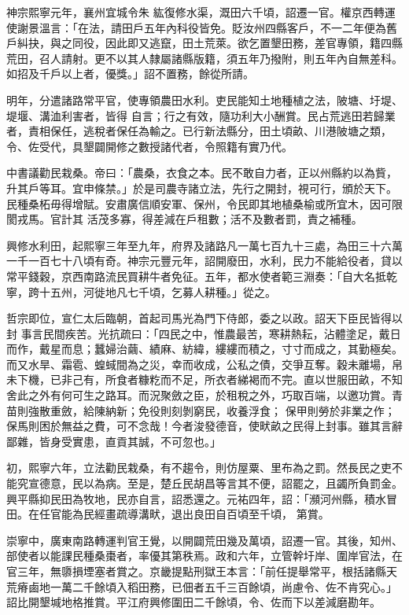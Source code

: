 \begin{pinyinscope}
 神宗熙寧元年，襄州宜城令朱
 紘復修水渠，溉田六千頃，詔遷一官。權京西轉運使謝景溫言：「在法，請田戶五年內科役皆免。貶汝州四縣客戶，不一二年便為舊戶糾抉，與之同役，因此即又逃竄，田土荒萊。欲乞置墾田務，差官專領，籍四縣荒田，召人請射。更不以其人隸屬諸縣版籍，須五年乃撥附，則五年內自無差科。如招及千戶以上者，優獎。」詔不置務，餘從所請。



 明年，分遣諸路常平官，使專領農田水利。吏民能知土地種植之法，陂塘、圩堤、堤堰、溝洫利害者，皆得
 自言；行之有效，隨功利大小酬賞。民占荒逃田若歸業者，責相保任，逃稅者保任為輸之。已行新法縣分，田土頃畝、川港陂塘之類，令、佐受代，具墾闢開修之數授諸代者，令照籍有實乃代。



 中書議勸民栽桑。帝曰：「農桑，衣食之本。民不敢自力者，正以州縣約以為貲，升其戶等耳。宜申條禁。」於是司農寺諸立法，先行之開封，視可行，頒於天下。民種桑柘毋得增賦。安肅廣信順安軍、保州，令民即其地植桑榆或所宜木，因可限閡戎馬。官計其
 活茂多寡，得差減在戶租數；活不及數者罰，責之補種。



 興修水利田，起熙寧三年至九年，府界及諸路凡一萬七百九十三處，為田三十六萬一千一百七十八頃有奇。神宗元豐元年，詔開廢田，水利，民力不能給役者，貸以常平錢穀，京西南路流民買耕牛者免征。五年，都水使者範三淵奏：「自大名抵乾寧，跨十五州，河徙地凡七千頃，乞募人耕種。」從之。



 哲宗即位，宣仁太后臨朝，首起司馬光為門下侍郎，委之以政。詔天下臣民皆得以封
 事言民間疾苦。光抗疏曰：「四民之中，惟農最苦，寒耕熱耘，沾體塗足，戴日而作，戴星而息；蠶婦治繭、績麻、紡緯，縷縷而積之，寸寸而成之，其勤極矣。而又水旱、霜雹、蝗蜮間為之災，幸而收成，公私之債，交爭互奪。穀未離場，帛未下機，已非己有，所食者糠籺而不足，所衣者綈褐而不完。直以世服田畝，不知舍此之外有何可生之路耳。而況聚斂之臣，於租稅之外，巧取百端，以邀功賞。青苗則強散重斂，給陳納新；免役則刻剝窮民，收養浮食；
 保甲則勞於非業之作；保馬則困於無益之費，可不念哉！今者浚發德音，使畎畝之民得上封事。雖其言辭鄙雜，皆身受實患，直貢其誠，不可忽也。」



 初，熙寧六年，立法勸民栽桑，有不趨令，則仿屋粟、里布為之罰。然長民之吏不能究宣德意，民以為病。至是，楚丘民胡昌等言其不便，詔罷之，且蠲所負罰金。興平縣抑民田為牧地，民亦自言，詔悉還之。元祐四年，詔：「瀕河州縣，積水冒田。在任官能為民經畫疏導溝畎，退出良田自百頃至千頃，
 第賞。



 崇寧中，廣東南路轉運判官王覺，以開闢荒田幾及萬頃，詔遷一官。其後，知州、部使者以能課民種桑棗者，率優其第秩焉。政和六年，立管幹圩岸、圍岸官法，在官三年，無隳損堙塞者賞之。京畿提點刑獄王本言：「前任提舉常平，根括諸縣天荒瘠鹵地一萬二千餘頃入稻田務，已佃者五千三百餘頃，尚慮令、佐不肯究心。」詔比開墾堿地格推賞。平江府興修圍田二千餘頃，令、佐而下以差減磨勘年。




\end{pinyinscope}
